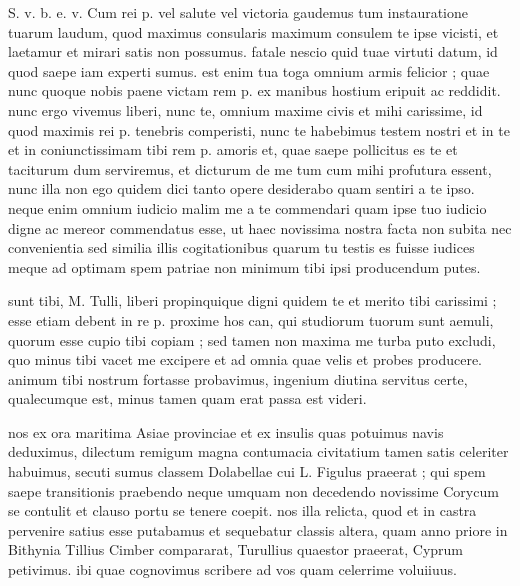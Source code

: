 


 S. v. b. e. v. Cum rei p. vel salute vel victoria gaudemus tum instauratione tuarum laudum, quod maximus consularis maximum consulem te ipse vicisti, et laetamur et mirari satis non possumus. fatale nescio quid tuae virtuti datum, id quod saepe iam experti sumus. est enim tua toga omnium armis felicior ; quae nunc quoque nobis paene victam rem p. ex manibus hostium eripuit ac reddidit. nunc ergo vivemus liberi, nunc te, omnium maxime civis et mihi carissime, id quod maximis rei p. tenebris comperisti, nunc te habebimus testem nostri et in te et in coniunctissimam tibi rem p. amoris et, quae saepe pollicitus es te et taciturum dum serviremus, et dicturum de me tum cum mihi profutura essent, nunc illa non ego quidem dici tanto opere desiderabo quam sentiri a te ipso. neque enim omnium iudicio malim me a te commendari quam ipse tuo iudicio digne ac mereor commendatus esse, ut haec novissima nostra facta non subita nec convenientia sed similia illis cogitationibus quarum tu testis es fuisse iudices meque ad optimam spem patriae non minimum tibi ipsi producendum putes.

 sunt tibi, M. Tulli, liberi propinquique digni quidem te et merito tibi carissimi ; esse etiam debent in re p. proxime hos can, qui studiorum tuorum sunt aemuli, quorum esse cupio tibi copiam ; sed tamen non maxima me turba puto excludi, quo minus tibi vacet me excipere et ad omnia quae velis et probes producere. animum tibi nostrum fortasse probavimus, ingenium diutina servitus certe, qualecumque est, minus tamen quam erat passa est videri.

 nos ex ora maritima Asiae provinciae et ex insulis quas potuimus navis deduximus, dilectum remigum magna contumacia civitatium tamen satis celeriter habuimus, secuti sumus classem Dolabellae cui L. Figulus praeerat ; qui spem saepe transitionis praebendo neque umquam non decedendo novissime Corycum se contulit et clauso portu se tenere coepit. nos illa relicta, quod et in castra pervenire satius esse putabamus et sequebatur classis altera, quam anno priore in Bithynia Tillius Cimber compararat, Turullius quaestor praeerat, Cyprum petivimus. ibi quae cognovimus scribere ad vos quam celerrime voluiiuus.


